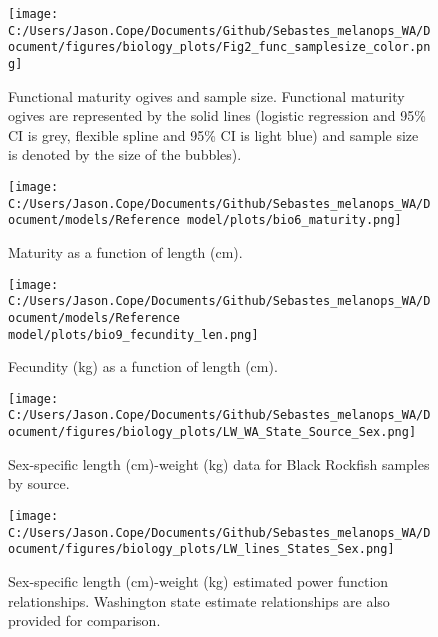 \documentclass[11pt,
  english,
  letterpaper,
]{article}
\begin{document}
\pagebreak

\begin{figure}
\centering
\texttt{[image: C:/Users/Jason.Cope/Documents/Github/Sebastes\_melanops\_WA/Document/figures/biology\_plots/Fig2\_func\_samplesize\_color.png]}
\caption{Functional maturity ogives and sample size. Functional maturity ogives are represented by the solid lines (logistic regression and 95\% CI is grey, flexible spline and 95\% CI is light blue) and sample size is denoted by the size of the bubbles).\label{fig:fxn-spline-mat-color}}
\end{figure}

\pagebreak

\begin{figure}
\centering
\texttt{[image: C:/Users/Jason.Cope/Documents/Github/Sebastes\_melanops\_WA/Document/models/Reference model/plots/bio6\_maturity.png]}
\caption{Maturity as a function of length (cm).\label{fig:maturity}}
\end{figure}

\pagebreak

\begin{figure}
\centering
\texttt{[image: C:/Users/Jason.Cope/Documents/Github/Sebastes\_melanops\_WA/Document/models/Reference model/plots/bio9\_fecundity\_len.png]}
\caption{Fecundity (kg) as a function of length (cm).\label{fig:fecundity}}
\end{figure}

\pagebreak

\begin{figure}
\centering
\texttt{[image: C:/Users/Jason.Cope/Documents/Github/Sebastes\_melanops\_WA/Document/figures/biology\_plots/LW\_WA\_State\_Source\_Sex.png]}
\caption{Sex-specific length (cm)-weight (kg) data for Black Rockfish samples by source.\label{fig:len-weight-data}}
\end{figure}

\pagebreak

\begin{figure}
\centering
\texttt{[image: C:/Users/Jason.Cope/Documents/Github/Sebastes\_melanops\_WA/Document/figures/biology\_plots/LW\_lines\_States\_Sex.png]}
\caption{Sex-specific length (cm)-weight (kg) estimated power function relationships. Washington state estimate relationships are also provided for comparison.\label{fig:len-weight-or-wa}}
\end{figure}
\end{document}
